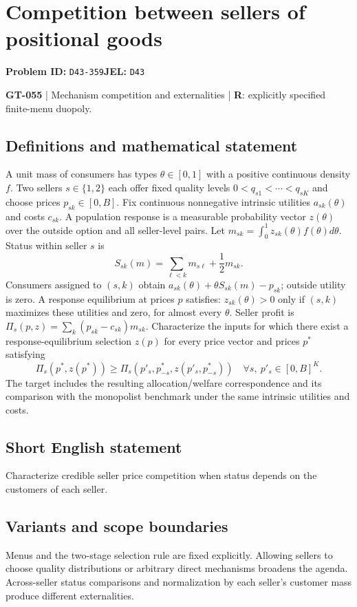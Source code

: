 \documentclass[11pt,a4paper]{article}
\begin{document}
\section*{Competition between sellers of positional goods}
\textbf{Problem ID:} \texttt{D43-359}\quad \textbf{JEL:} \texttt{D43}\par
\label{problem:OP-0185}
\label{game:GT-055}
{\sffamily\small\color{muted}
\textbf{GT-055} | Mechanism competition and externalities | \textbf{R}: explicitly specified finite-menu duopoly.
\par}
\subsection*{Definitions and mathematical statement}
A unit mass of consumers has types $\theta\in[0,1]$ with a positive continuous density $f$. Two sellers $s\in\{1,2\}$ each offer fixed quality levels $0<q_{s1}<\cdots<q_{sK}$ and choose prices $p_{sk}\in[0,B]$. Fix continuous nonnegative intrinsic utilities $a_{sk}(\theta)$ and costs $c_{sk}$. A population response is a measurable probability vector $z(\theta)$ over the outside option and all seller-level pairs. Let $m_{sk}=\int_0^1z_{sk}(\theta)f(\theta)d\theta$. Status within seller $s$ is
\[
 S_{sk}(m)=\sum_{\ell<k}m_{s\ell}+\frac12m_{sk}.
\]
Consumers assigned to $(s,k)$ obtain $a_{sk}(\theta)+\theta S_{sk}(m)-p_{sk}$; outside utility is zero. A response equilibrium at prices $p$ satisfies: $z_{sk}(\theta)>0$ only if $(s,k)$ maximizes these utilities and zero, for almost every $\theta$. Seller profit is $\Pi_s(p,z)=\sum_k(p_{sk}-c_{sk})m_{sk}$.
Characterize the inputs for which there exist a response-equilibrium selection $z(p)$ for every price vector and prices $p^*$ satisfying
\[
 \Pi_s(p^*,z(p^*))\geq
 \Pi_s(p'_s,p^*_{-s},z(p'_s,p^*_{-s}))
 \quad\forall s,\ p'_s\in[0,B]^K.
\]
The target includes the resulting allocation/welfare correspondence and its comparison with the monopolist benchmark under the same intrinsic utilities and costs.
\subsection*{Short English statement}
Characterize credible seller price competition when status depends on the customers of each seller.
\subsection*{Variants and scope boundaries}
Menus and the two-stage selection rule are fixed explicitly. Allowing sellers to choose quality distributions or arbitrary direct mechanisms broadens the agenda. Across-seller status comparisons and normalization by each seller's customer mass produce different externalities.
\end{document}
